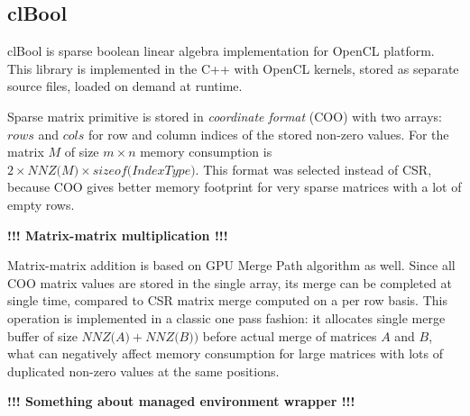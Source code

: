 \subsection{clBool}

clBool is sparse boolean linear algebra implementation for OpenCL platform. This library is implemented 
in the C++ with OpenCL kernels, stored as separate source files, loaded on demand at runtime. 

Sparse matrix primitive is stored in \textit{coordinate format} (COO) with two arrays: $rows$ and $cols$ 
for row and column indices of the stored non-zero values. For the matrix $M$ of size $m \times n$ memory 
consumption is $2 \times \textit{NNZ(M)} \times \textit{sizeof(IndexType)}$. This format was selected 
instead of CSR, because COO gives better memory footprint for very sparse matrices with a lot of empty rows.

\textbf{!!! Matrix-matrix multiplication !!!}

Matrix-matrix addition is based on GPU Merge Path algorithm as well. Since all COO matrix values are stored in 
the single array, its merge can be completed at single time, compared to CSR matrix merge computed on a 
per row basis. This operation is implemented in a classic one pass fashion: it allocates single merge 
buffer of size $\textit{NNZ(A)} + \textit{NNZ(B)})$ before actual merge of matrices $A$ and $B$, what can
negatively affect memory consumption for large matrices with lots of duplicated non-zero values at the 
same positions.

\textbf{!!! Something about managed environment wrapper !!!}
